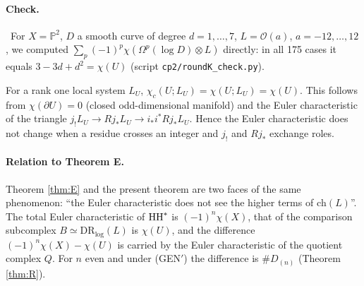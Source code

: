 \paragraph{Check.} \tV\ For $X=\mathbb P^2$, $D$ a smooth curve of degree $d=1,\dots,7$, $L=\mathcal O(a)$, $a=-12,\dots,12$, we computed $\sum_p(-1)^p\chi(\Omega^p(\log D)\otimes L)$ directly: in all 175 cases it equals $3-3d+d^2=\chi(U)$ (script \texttt{cp2/roundK\_check.py}).

\begin{cor}\label{cor:wall}
For a rank one local system $L_U$, $\chi_c(U;L_U)=\chi(U;L_U)=\chi(U)$. This follows from $\chi(\partial U)=0$ (closed odd-dimensional manifold) and the Euler characteristic of the triangle $j_!L_U\to Rj_*L_U\to i_*i^*Rj_*L_U$. Hence the Euler characteristic does not change when a residue crosses an integer and $j_!$ and $Rj_*$ exchange roles.
\end{cor}
\paragraph{Relation to Theorem E.} Theorem \ref{thm:E} and the present theorem are two faces of the same phenomenon: ``the Euler characteristic does not see the higher terms of $\mathrm{ch}(L)$''. The total Euler characteristic of $\mathrm{HH}^*$ is $(-1)^n\chi(X)$, that of the comparison subcomplex $B\simeq\mathrm{DR}_{\log}(L)$ is $\chi(U)$, and the difference $(-1)^n\chi(X)-\chi(U)$ is carried by the Euler characteristic of the quotient complex $Q$. For $n$ even and under (GEN$'$) the difference is $\#D_{(n)}$ (Theorem \ref{thm:R}).

